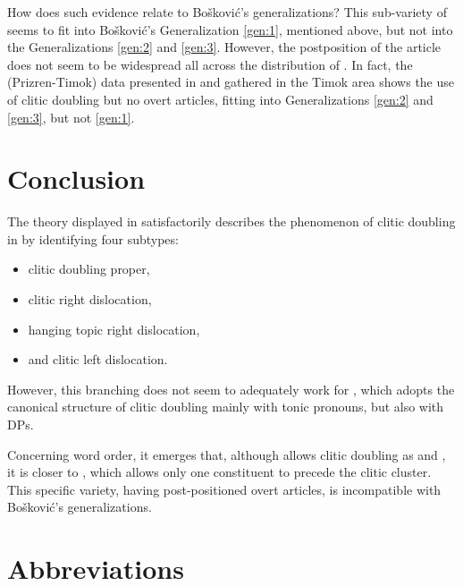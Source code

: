 \documentclass[output=paper,
colorlinks,
citecolor=brown,
newtxmath
]{langscibook}
\begin{document}
How does such evidence relate to Bošković’s generalizations? This sub-variety of  seems to fit into Bošković’s Generalization \ref{gen:1}, mentioned above, but not into the Generalizations \ref{gen:2} and \ref{gen:3}. However, the postposition of the article does not seem to be widespread all across the distribution of . In fact, the  (Prizren-Timok) data presented in \citet{Runic2014} and gathered in the Timok area shows the use of clitic doubling but no overt articles, fitting into Generalizations \ref{gen:2} and \ref{gen:3}, but not \ref{gen:1}.
%
%
\section{Conclusion}
\label{sec:conclusion}

The theory displayed in \citet{Cinque.Krapova2008} satisfactorily describes the phenomenon of clitic doubling in  by identifying four subtypes:
\begin{itemize}
\item clitic doubling proper,
\item clitic right dislocation,
\item hanging topic right dislocation,
\item and clitic left dislocation.
\end{itemize}
However, this branching does not seem to adequately work for , which adopts the canonical structure of clitic doubling mainly with tonic pronouns, but also with DPs.

Concerning word order, it emerges that, although  allows clitic doubling as  and , it is closer to , which allows only one constituent to precede the clitic cluster. This specific variety, having post-positioned overt articles, is incompatible with Bošković’s generalizations.


\section*{Abbreviations}
\end{document}
